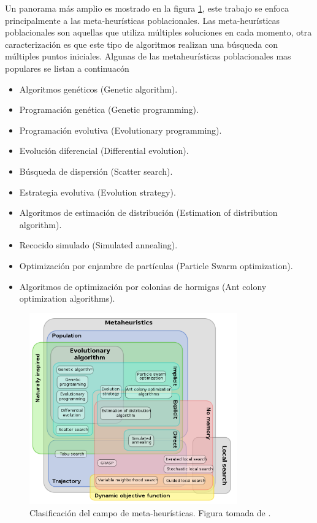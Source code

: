 Un panorama más amplio es mostrado en la figura \ref{fig:clasificacion}, este trabajo se enfoca principalmente a las meta-heurísticas poblacionales.
%
Las meta-heurísticas poblacionales son aquellas que utiliza múltiples soluciones en cada momento, otra caracterización es que este tipo de algoritmos realizan una búsqueda con múltiples puntos iniciales.
%
Algunas de las metaheurísticas poblacionales mas populares se listan a continuacón
\begin{itemize}
    \item Algoritmos genéticos (Genetic algorithm).
    \item Programación genética (Genetic programming).
    \item Programación evolutiva (Evolutionary programming).
    \item Evolución diferencial (Differential evolution).
    \item Búsqueda de dispersión (Scatter search).
    \item Estrategia evolutiva (Evolution strategy).
    \item Algoritmos de estimación de distribución (Estimation of distribution algorithm).
    \item Recocido simulado (Simulated annealing).
    \item Optimización por enjambre de partículas (Particle Swarm optimization).
    \item Algoritmos de optimización por colonias de hormigas (Ant colony optimization algorithms).
\end{itemize}

\begin{figure}[H]
\centering
\includegraphics[width=0.8\textwidth]{clasificacion.png}
\caption{Clasificación del campo de meta-heurísticas. Figura tomada de \cite{beheshti2013review}.}
\label{fig:clasificacion}
\end{figure}




